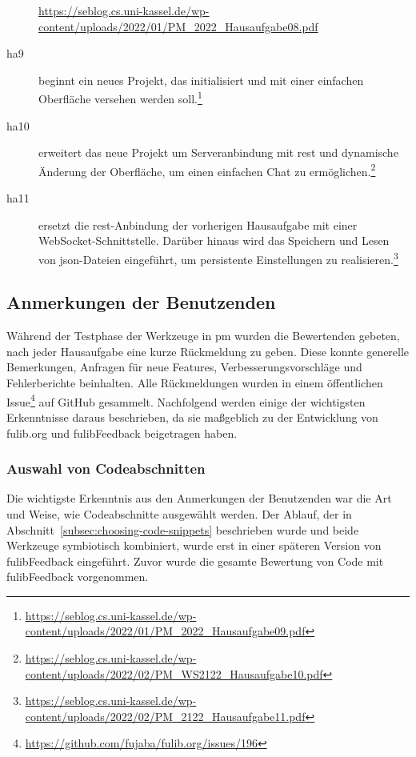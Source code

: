 \begin{description}
{        \url{https://seblog.cs.uni-kassel.de/wp-content/uploads/2022/01/PM_2022_Hausaufgabe08.pdf}
    }
    \item[\ac{ha}9] beginnt ein neues Projekt, das initialisiert und mit einer einfachen Oberfläche versehen werden soll.\footnote{
        \url{https://seblog.cs.uni-kassel.de/wp-content/uploads/2022/01/PM_2022_Hausaufgabe09.pdf}
    }
    \item[\ac{ha}10] erweitert das neue Projekt um Serveranbindung mit \ac{rest} und dynamische Änderung der Oberfläche, um einen einfachen Chat zu ermöglichen.\footnote{
        \url{https://seblog.cs.uni-kassel.de/wp-content/uploads/2022/02/PM_WS2122_Hausaufgabe10.pdf}
    }
    \item[\ac{ha}11] ersetzt die \ac{rest}-Anbindung der vorherigen Hausaufgabe mit einer WebSocket-Schnittstelle.
    Darüber hinaus wird das Speichern und Lesen von \ac{json}-Dateien eingeführt, um persistente Einstellungen zu realisieren.\footnote{
        \url{https://seblog.cs.uni-kassel.de/wp-content/uploads/2022/02/PM_2122_Hausaufgabe11.pdf}
    }
\end{description}

\subsection{Anmerkungen der Benutzenden}\label{subsec:user-feedback}

Während der Testphase der Werkzeuge in \ac{pm} wurden die Bewertenden gebeten, nach jeder Hausaufgabe eine kurze Rückmeldung zu geben.
Diese konnte generelle Bemerkungen, Anfragen für neue Features, Verbesserungsvorschläge und Fehlerberichte beinhalten.
Alle Rückmeldungen wurden in einem öffentlichen Issue\footnote{
    \url{https://github.com/fujaba/fulib.org/issues/196}
} auf GitHub gesammelt.
Nachfolgend werden einige der wichtigsten Erkenntnisse daraus beschrieben, da sie maßgeblich zu der Entwicklung von fulib.org und fulibFeedback beigetragen haben.

\subsubsection{Auswahl von Codeabschnitten}

Die wichtigste Erkenntnis aus den Anmerkungen der Benutzenden war die Art und Weise, wie Codeabschnitte ausgewählt werden.
Der Ablauf, der in Abschnitt~\ref{subsec:choosing-code-snippets} beschrieben wurde und beide Werkzeuge symbiotisch kombiniert, wurde erst in einer späteren Version von fulibFeedback eingeführt.
Zuvor wurde die gesamte Bewertung von Code mit fulibFeedback vorgenommen.

